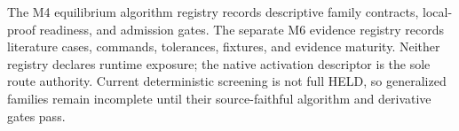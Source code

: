 \documentclass[12pt, letterpaper]{article}
\begin{document}

The M4 equilibrium algorithm registry records descriptive family contracts,
local-proof readiness, and admission gates. The separate M6 evidence registry
records literature cases, commands, tolerances, fixtures, and evidence
maturity. Neither registry declares runtime exposure; the native activation
descriptor is the sole route authority. Current deterministic screening is not
full HELD, so generalized families remain incomplete until their source-faithful
algorithm and derivative gates pass.

\end{document}
